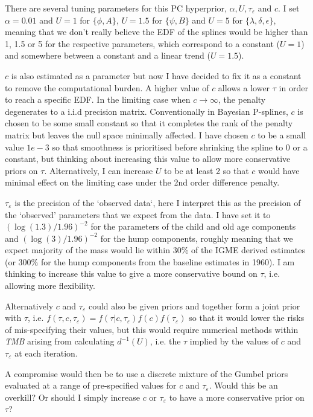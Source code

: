 \documentclass[12pt,a4paper]{article}
\begin{document}
\begin{itemize}
\begin{itemize}
There are several tuning parameters for this PC hyperprior, $\alpha, U, \tau_{\varepsilon}$ and $c$. I set $\alpha = 0.01$ and $U = 1$ for $\{\phi, A\}$, $U = 1.5$ for $\{\psi, B\}$ and $U = 5$ for $\{\lambda, \delta, \epsilon \}$, meaning that we don't really believe the EDF of the splines would be higher than 1, 1.5 or 5 for the respective parameters, which correspond to a constant ($U = 1$) and somewhere between a constant and a linear trend ($U = 1.5$). 

$c$ is also estimated as a parameter but now I have decided to fix it as a constant to remove the computational burden. A higher value of $c$ allows a lower $\tau$ in order to reach a specific EDF. In the limiting case when $c \to \infty$, the penalty degenerates to a i.i.d precision matrix. Conventionally in Bayesian P-splines, $c$ is chosen to be some small constant so that it completes the rank of the penalty matrix but leaves the null space minimally affected. I have chosen $c$ to be a small value $1e-3$ so that smoothness is prioritised before shrinking the spline to 0 or a constant, but thinking about increasing this value to allow more conservative priors on $\tau$. Alternatively, I can increase $U$ to be at least 2 so that $c$ would have minimal effect on the limiting case under the 2nd order difference penalty.

$\tau_{\varepsilon}$ is the precision of the `observed data`, here I interpret this as the precision of the `observed' parameters that we expect from the data. I have set it to $(\log(1.3) / 1.96)^{-2}$ for the parameters of the child and old age components and $(\log(3) / 1.96)^{-2}$ for the hump components, roughly meaning that we expect majority of the mass would lie within 30\% of the IGME derived estimates (or 300\% for the hump components from the baseline estimates in 1960). I am thinking to increase this value to give a more conservative bound on $\tau$, i.e. allowing more flexibility. 
	
Alternatively $c$ and $\tau_{\varepsilon}$ could also be given priors and together form a joint prior with $\tau$, i.e. $f(\tau, c, \tau_{\varepsilon}) = f(\tau | c, \tau_{\varepsilon})f(c)f(\tau_{\varepsilon})$ so that it would lower the risks of mis-specifying their values, but this would require numerical methods within \textit{TMB} arising from calculating $d^{-1}(U)$, i.e. the $\tau$ implied by the values of $c$ and $\tau_{\varepsilon}$ at each iteration.

A compromise would then be to use a discrete mixture of the Gumbel priors evaluated at a range of pre-specified values for $c$ and $\tau_{\varepsilon}$. Would this be an overkill? Or should I simply increase $c$ or  $\tau_{\varepsilon}$ to have a more conservative prior on $\tau$?
	\end{itemize}
	

\end{itemize}
\end{document}
